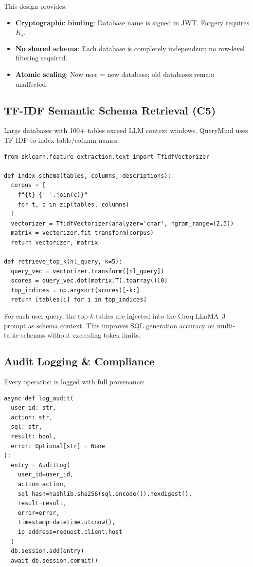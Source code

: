 \documentclass[conference]{IEEEtran}
\begin{document}
This design provides:
\begin{itemize}
  \item \textbf{Cryptographic binding}: Database name is signed in JWT. Forgery requires $K_s$.
  \item \textbf{No shared schema}: Each database is completely independent; no row-level filtering required.
  \item \textbf{Atomic scaling}: New user = new database; old databases remain unaffected.
\end{itemize}

\subsection{TF-IDF Semantic Schema Retrieval (C5)}
Large databases with 100+ tables exceed LLM context windows. QueryMind uses TF-IDF to index table/column names:
\begin{lstlisting}
from sklearn.feature_extraction.text import TfidfVectorizer

def index_schema(tables, columns, descriptions):
  corpus = [
    f"{t} {' '.join(c)}" 
    for t, c in zip(tables, columns)
  ]
  vectorizer = TfidfVectorizer(analyzer='char', ngram_range=(2,3))
  matrix = vectorizer.fit_transform(corpus)
  return vectorizer, matrix

def retrieve_top_k(nl_query, k=5):
  query_vec = vectorizer.transform([nl_query])
  scores = query_vec.dot(matrix.T).toarray()[0]
  top_indices = np.argsort(scores)[-k:]
  return [tables[i] for i in top_indices]
\end{lstlisting}

For each user query, the top-$k$ tables are injected into the Groq LLaMA~3 prompt as schema context. This improves SQL generation accuracy on multi-table schemas without exceeding token limits.

\subsection{Audit Logging \& Compliance}
Every operation is logged with full provenance:
\begin{lstlisting}
async def log_audit(
  user_id: str,
  action: str,
  sql: str,
  result: bool,
  error: Optional[str] = None
):
  entry = AuditLog(
    user_id=user_id,
    action=action,
    sql_hash=hashlib.sha256(sql.encode()).hexdigest(),
    result=result,
    error=error,
    timestamp=datetime.utcnow(),
    ip_address=request.client.host
  )
  db.session.add(entry)
  await db.session.commit()
\end{lstlisting}
\end{document}
